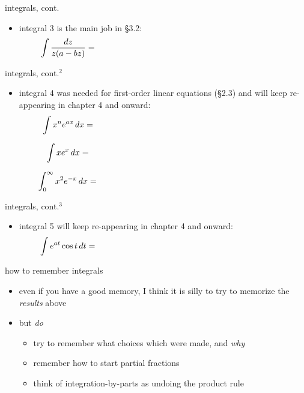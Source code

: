 \documentclass[colorlinks]{beamer}
\begin{document}
\begin{frame}{integrals, cont.}

\begin{itemize}
\item {\color{blue} integral 3} is the main job in \S3.2:
    $$\int \frac{dz}{z(a-bz)} = \hspace{80mm}$$

\vspace{50mm}
\end{itemize}
\end{frame}


\begin{frame}{integrals, cont.$^2$}

\begin{itemize}
\item {\color{blue} integral 4} was needed for first-order linear equations (\S2.3) and will keep re-appearing in chapter 4 and onward:
    $$\int x^n e^{ax}\,dx = \hspace{80mm}$$

\vspace{30mm}

$$\int x e^x\,dx = \hspace{80mm}$$

$$\int_0^\infty x^2 e^{-x}\,dx = \hspace{80mm}$$
\end{itemize}
\end{frame}


\begin{frame}{integrals, cont.$^3$}

\begin{itemize}
\item {\color{blue} integral 5} will keep re-appearing in chapter 4 and onward:
    $$\int e^{at} \cos t\,dt = \hspace{80mm}$$

\vspace{60mm}
\end{itemize}
\end{frame}


\begin{frame}{how to remember integrals}

\begin{itemize}
\item even if you have a good memory, I think it is silly to try to memorize the \emph{results} above
\item but \emph{do}
    \begin{itemize}
    \item try to remember what choices which were made, and \emph{why}
    \item remember how to start partial fractions
    \item think of integration-by-parts as undoing the product rule
    \end{itemize}
\end{itemize}
\end{frame}
\end{document}
